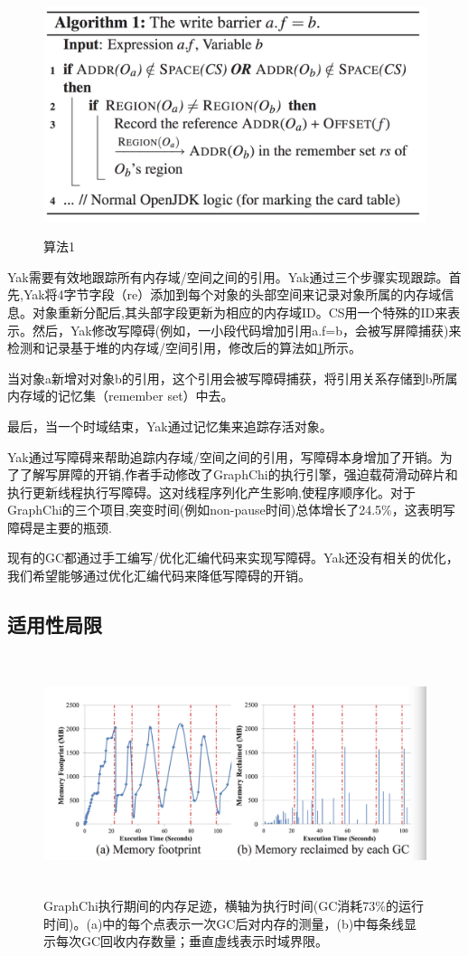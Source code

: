 \begin{figure}[h]
    \centering
    \includegraphics[width=12cm,height=7cm]{figure/algorithm1.jpg}
    \caption{
        算法1
    }
    \label{algorithm1}
\end{figure}
Yak需要有效地跟踪所有内存域/空间之间的引用。Yak通过三个步骤实现跟踪。首先,Yak将4字节字段（re）添加到每个对象的头部空间来记录对象所属的内存域信息。对象重新分配后,其头部字段更新为相应的内存域ID。CS用一个特殊的ID来表示。然后，Yak修改写障碍(例如，一小段代码增加引用a.f=b，会被写屏障捕获)来检测和记录基于堆的内存域/空间引用，修改后的算法如\ref{algorithm1}所示。

当对象a新增对对象b的引用，这个引用会被写障碍捕获，将引用关系存储到b所属内存域的记忆集（remember set）中去。

最后，当一个时域结束，Yak通过记忆集来追踪存活对象。

Yak通过写障碍来帮助追踪内存域/空间之间的引用，写障碍本身增加了开销。为了了解写屏障的开销,作者手动修改了GraphChi的执行引擎，强迫载荷滑动碎片和执行更新线程执行写障碍。这对线程序列化产生影响,使程序顺序化。对于GraphChi的三个项目,突变时间(例如non-pause时间)总体增长了24.5\%，这表明写障碍是主要的瓶颈.

现有的GC都通过手工编写/优化汇编代码来实现写障碍。Yak还没有相关的优化，我们希望能够通过优化汇编代码来降低写障碍的开销。


\subsection{适用性局限}
\begin{figure}[h]
    \centering
    \includegraphics[width=12cm,height=7cm]{figure/footprint1.jpg}
    \caption{
        GraphChi执行期间的内存足迹，横轴为执行时间(GC消耗73\%的运行时间)。(a)中的每个点表示一次GC后对内存的测量，(b)中每条线显示每次GC回收内存数量；垂直虚线表示时域界限。
    }
    \label{footprint1}
\end{figure}

